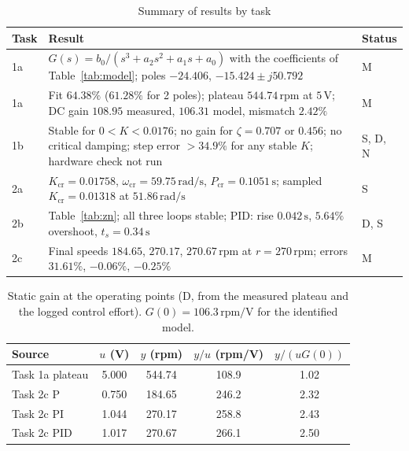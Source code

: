 \documentclass[lettersize,journal]{IEEEtran}
\newcommand{\Kcr}{K_{\mathrm{cr}}}
\newcommand{\wcr}{\omega_{\mathrm{cr}}}
\newcommand{\Pcr}{P_{\mathrm{cr}}}
\newcommand{\rpm}{\,\text{rpm}}
\begin{document}
\begin{table}[H]
\centering
\caption{Summary of results by task}
\label{tab:summary}
\footnotesize
\begin{tabular}{@{}p{0.7cm}p{5.3cm}p{1.1cm}@{}}
\toprule
Task & Result & Status \\
\midrule
1a & $G(s)=b_0/(s^3+a_2s^2+a_1s+a_0)$ with the coefficients of Table~\ref{tab:model}; poles $-24.406$, $-15.424\pm j50.792$ & M \\
1a & Fit $64.38\%$ ($61.28\%$ for 2 poles); plateau $544.74\rpm$ at $5\,\text{V}$; DC gain $108.95$ measured, $106.31$ model, mismatch $2.42\%$ & M \\
1b & Stable for $0<K<0.0176$; no gain for $\zeta=0.707$ or $0.456$; no critical damping; step error $>34.9\%$ for any stable $K$; hardware check not run & S, D, N \\
2a & $\Kcr=0.01758$, $\wcr=59.75\,\text{rad/s}$, $\Pcr=0.1051\,\text{s}$; sampled $\Kcr=0.01318$ at $51.86\,\text{rad/s}$ & S \\
2b & Table~\ref{tab:zn}; all three loops stable; PID: rise $0.042\,\text{s}$, $5.64\%$ overshoot, $t_s=0.34\,\text{s}$ & D, S \\
2c & Final speeds $184.65$, $270.17$, $270.67\rpm$ at $r=270\rpm$; errors $31.61\%$, $-0.06\%$, $-0.25\%$ & M \\
\bottomrule
\end{tabular}
\end{table}

\begin{table}[H]
\centering
\caption{Static gain at the operating points (D, from the measured plateau and the logged control effort). $G(0)=106.3\rpm/\text{V}$ for the identified model.}
\label{tab:opp}
\footnotesize
\setlength{\tabcolsep}{3.5pt}
\begin{tabular}{@{}lcccc@{}}
\toprule
Source & $u$ (V) & $y$ (rpm) & $y/u$ (rpm/V) & $y/(uG(0))$ \\
\midrule
Task 1a plateau & 5.000 & 544.74 & 108.9 & 1.02 \\
Task 2c P       & 0.750 & 184.65 & 246.2 & 2.32 \\
Task 2c PI      & 1.044 & 270.17 & 258.8 & 2.43 \\
Task 2c PID     & 1.017 & 270.67 & 266.1 & 2.50 \\
\bottomrule
\end{tabular}
\end{table}
\end{document}

